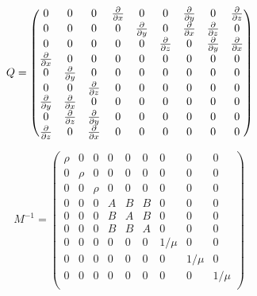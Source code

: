 \documentclass[pdftex,a4paper,parskip,listof=totoc,bibliography=totoc,onehalfspacing,12pt]{scrreprt}
\begin{document}
\begin{equation}
Q=
 \begin{pmatrix}
   0          & 0         & 0         & \pdv{}{x} & 0         & 0         & \pdv{}{y} & 0         & \pdv{}{z}\\
   0          & 0         & 0         & 0         & \pdv{}{y} & 0         & \pdv{}{x} & \pdv{}{z} & 0        \\
   0          & 0         & 0         & 0         & 0         & \pdv{}{z} & 0         & \pdv{}{y} & \pdv{}{x}\\
   \pdv{}{x}  & 0         & 0         & 0         & 0         & 0         & 0         & 0         & 0        \\
   0          & \pdv{}{y} & 0         & 0         & 0         & 0         & 0         & 0         & 0        \\
   0          & 0         & \pdv{}{z} & 0         & 0         & 0         & 0         & 0         & 0        \\
   \pdv{}{y}  & \pdv{}{x} &  0        & 0         & 0         & 0         & 0         & 0         & 0        \\
   0          & \pdv{}{z} & \pdv{}{y} & 0         & 0         & 0         & 0         & 0         & 0        \\
   \pdv{}{z}  & 0         & \pdv{}{x} & 0         & 0         & 0         & 0         & 0         & 0        \\
 \end{pmatrix}
\end{equation}

\begin{equation}
M^{-1}=
 \begin{pmatrix}
   \rho       & 0         & 0         & 0         & 0         & 0         & 0         & 0         & 0       \\
   0          & \rho      & 0         & 0         & 0         & 0         & 0         & 0         & 0        \\
   0          & 0         & \rho      & 0         & 0         & 0         & 0         & 0         & 0        \\
   0          & 0         & 0         & A         & B         & B         & 0         & 0         & 0        \\
   0          & 0         & 0         & B         & A         & B         & 0         & 0         & 0        \\
   0          & 0         & 0         & B         & B         & A         & 0         & 0         & 0        \\
   0          & 0         & 0         & 0         & 0         & 0         & 1/\mu      & 0         & 0        \\
   0          & 0         & 0         & 0         & 0         & 0         & 0         & 1/\mu      & 0        \\
   0          & 0         & 0         & 0         & 0         & 0         & 0         & 0         & 1/\mu     \\
 \end{pmatrix}
\end{equation}
\end{document}
